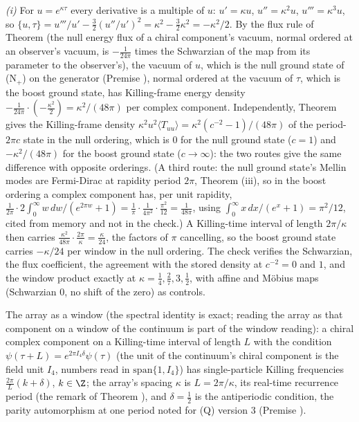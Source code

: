\emph{(i)} For $u = e^{\kappa\tau}$ every derivative is a multiple of $u$: $u' = \kappa u$, $u'' = \kappa^{2}u$, $u''' = \kappa^{3}u$, so $\{u, \tau\} = u'''/u' - \tfrac32(u''/u')^{2} = \kappa^{2} - \tfrac32\kappa^{2} = -\kappa^{2}/2$. By the flux rule of Theorem  (the null energy flux of a chiral component's vacuum, normal ordered at an observer's vacuum, is $-\tfrac{1}{24\pi}$ times the Schwarzian of the map from its parameter to the observer's), the vacuum of $u$, which is the null ground state of (N$_{+}$) on the generator (Premise ), normal ordered at the vacuum of $\tau$, which is the boost ground state, has Killing-frame energy density $-\tfrac{1}{24\pi}\cdot(-\tfrac{\kappa^{2}}{2}) = \kappa^{2}/(48\pi)$ per complex component. Independently, Theorem  gives the Killing-frame density $\kappa^{2}u^{2}\langle T_{uu}\rangle = \kappa^{2}(c^{-2} - 1)/(48\pi)$ of the period-$2\pi c$ state in the null ordering, which is $0$ for the null ground state ($c = 1$) and $-\kappa^{2}/(48\pi)$ for the boost ground state ($c \to \infty$): the two routes give the same difference with opposite orderings. (A third route: the null ground state's Mellin modes are Fermi-Dirac at rapidity period $2\pi$, Theorem (iii), so in the boost ordering a complex component has, per unit rapidity, $\tfrac{1}{2\pi}\cdot 2\int_{0}^{\infty}w\,dw/(e^{2\pi w} + 1) = \tfrac{1}{\pi}\cdot\tfrac{1}{4\pi^{2}}\cdot\tfrac{\pi^{2}}{12} = \tfrac{1}{48\pi}$, using $\int_{0}^{\infty}x\,dx/(e^{x} + 1) = \pi^{2}/12$, cited from memory and not in the check.) A Killing-time interval of length $2\pi/\kappa$ then carries $\tfrac{\kappa^{2}}{48\pi}\cdot\tfrac{2\pi}{\kappa} = \tfrac{\kappa}{24}$, the factors of $\pi$ cancelling, so the boost ground state carries $-\kappa/24$ per window in the null ordering. The check verifies the Schwarzian, the flux coefficient, the agreement with the stored density at $c^{-2} = 0$ and $1$, and the window product exactly at $\kappa = \tfrac14, \tfrac27, 3, \tfrac12$, with affine and M\"obius maps (Schwarzian $0$, no shift of the zero) as controls.

The array as a window (the spectral identity is exact; reading the array as that component on a window of the continuum is part of the window reading): a chiral complex component on a Killing-time interval of length $L$ with the condition $\psi(\tau + L) = e^{2\pi I_{4}\delta}\psi(\tau)$ (the unit of the continuum's chiral component is the field unit $I_{4}$, numbers read in $\mathrm{span}\{1, I_{4}\}$) has single-particle Killing frequencies $\tfrac{2\pi}{L}(k + \delta)$, $k \in \Z$; the array's spacing $\kappa$ is $L = 2\pi/\kappa$, its real-time recurrence period (the remark of Theorem ), and $\delta = \tfrac12$ is the antiperiodic condition, the parity automorphism at one period noted for (Q) version 3 (Premise ).

